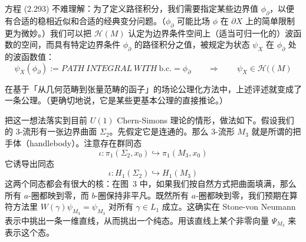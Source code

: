 方程 (2.293) 不难理解：为了定义路径积分，我们需要指定某些边界值 $\phi_\partial$，以便有合适的稳相近似和合适的经典变分问题。（$\phi_\partial$ 可能比场 $\phi$ 在 $\partial X$ 上的简单限制更为微妙。）我们可以把 $\mathcal{H}(M)$ 认定为边界条件空间上（适当可归一化的）波函数的空间，而具有特定边界条件 $\phi_\partial$ 的路径积分之值，被规定为状态 $\psi_X$ 在 $\phi_\partial$ 处的波函数值：
\begin{equation}
  \psi_X(\phi_\partial):=\mathit{PATH\ INTEGRAL\ WITH}\ \mathrm{b.c.}=\phi_\partial
  \qquad\Rightarrow\qquad
  \psi_X\in\mathcal{H}((M)
  \tag{2.294}
  \label{eq:2.294}
\end{equation}

在基于「从几何范畴到张量范畴的函子」的场论公理化方法中，上述评述就变成了一条公理。（更确切地说，它是某些更基本公理的直接推论。）

把这一想法落实到目前 $U(1)$ Chern-Simons 理论的情形，做法如下。假设我们的 3-流形有一张边界曲面 $\Sigma_2$。先假定它是连通的。那么 3-流形 $M_3$ 就是所谓的把手体（handlebody）。注意存在群同态
\begin{equation}
  \iota:\pi_1(\Sigma_2,x_0)\hookrightarrow\pi_1(M_3,x_0)
  \tag{2.295}
  \label{eq:2.295}
\end{equation}
它诱导出同态
\begin{equation}
  \iota:H_1(\Sigma_2)\hookrightarrow H_1(M_3)
  \tag{2.296}
  \label{eq:2.296}
\end{equation}
这两个同态都会有很大的核：在图~3 中，如果我们按自然方式把曲面填满，那么所有 $a$-圈都映到零，而 $b$-圈保持非平凡。既然所有 $a$-圈都映到零，我们预期在算符方法里 $W(\gamma)\psi_{M_3}=\psi_{M_3}$ 对所有 $\gamma\in L_1$ 成立。这确实在 Stone-von Neumann 表示中挑出一条一维直线，从而挑出一个纯态。用该直线上某个非零向量 $\Psi_{M_3}$ 来表示这个态。

